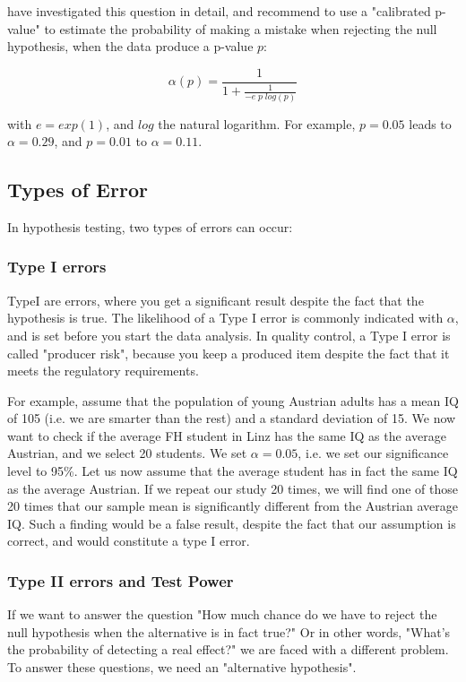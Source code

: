 \cite{sellke2001} have investigated this question in detail, and recommend to use a "calibrated p-value" to estimate the probability of making a mistake when rejecting the null hypothesis, when the data produce a p-value $p$:

\begin{equation}\label{eq:pFallacy}
    \alpha(p)= \frac{1}{1 + \frac{1}{-e \; p \; log(p)}}
\end{equation}

with $e=exp(1)$, and $log$ the natural logarithm. For example, $p=0.05$ leads to $\alpha=0.29$, and $p=0.01$ to $\alpha=0.11$.

\subsection{Types of Error}
In hypothesis testing, two types of errors can occur:

\subsubsection{Type I errors}  
\gls{TypeI} are errors, where you get a significant result despite the fact that the hypothesis is true. The likelihood of a Type I error is commonly indicated with $\alpha$, and is set before you start the data analysis. In quality control, a Type I error is called "producer risk", because you keep a produced item despite the fact that it meets the regulatory requirements.

For example, assume that the population of young Austrian adults has a mean IQ of 105 (i.e. we are smarter than the rest) and a standard deviation of 15. We now want to check if the average FH student in Linz has the same IQ as the average Austrian, and we select 20 students. We set $\alpha=0.05$, i.e. we set our significance level to 95\%.
Let us now assume that the average student has in fact the same IQ as the average Austrian. If we repeat our study 20 times, we will find one of those 20 times that our sample mean is significantly different from the Austrian average IQ. Such a finding would be a false result, despite the fact that our assumption is correct, and would constitute a type I error.

\subsubsection{Type II errors and Test Power}
If we want to answer the question "How much chance do we have to reject the null hypothesis when the alternative is in fact true?" Or in other words, "What’s the probability of detecting a real effect?" we are faced with a different problem. To answer these questions, we need an "alternative hypothesis".


